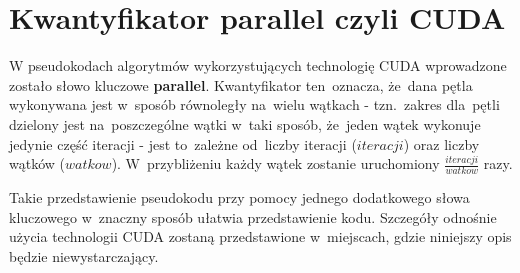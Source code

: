 \section{Kwantyfikator parallel czyli CUDA}

W pseudokodach algorytmów wykorzystujących technologię CUDA wprowadzone zostało słowo kluczowe \textbf{parallel}. Kwantyfikator ten~oznacza, że~dana pętla wykonywana jest w~sposób równoległy na~wielu wątkach - tzn.~zakres dla~pętli dzielony jest na~poszczególne wątki w~taki sposób, że~jeden wątek wykonuje jedynie część iteracji - jest to~zależne od~liczby iteracji ($iteracji$) oraz liczby wątków ($watkow$). W~przybliżeniu każdy wątek zostanie uruchomiony $\frac{iteracji}{watkow}$ razy.

Takie przedstawienie pseudokodu przy pomocy jednego dodatkowego słowa kluczowego w~znaczny sposób ułatwia przedstawienie kodu. Szczegóły odnośnie użycia technologii CUDA zostaną przedstawione w~miejscach, gdzie niniejszy opis będzie niewystarczający.